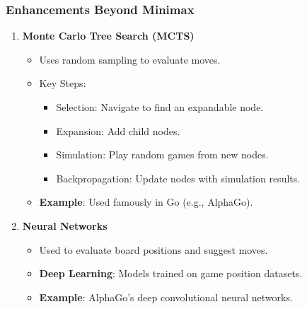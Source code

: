 \documentclass[aspectratio=169]{beamer}
\begin{document}
\begin{frame}[fragile]
    \frametitle{Enhancements Beyond Minimax}
    \begin{enumerate}
        \item \textbf{Monte Carlo Tree Search (MCTS)}
        \begin{itemize}
            \item Uses random sampling to evaluate moves.
            \item Key Steps:
            \begin{itemize}
                \item Selection: Navigate to find an expandable node.
                \item Expansion: Add child nodes.
                \item Simulation: Play random games from new nodes.
                \item Backpropagation: Update nodes with simulation results.
            \end{itemize}
            \item \textbf{Example}: Used famously in Go (e.g., AlphaGo).
        \end{itemize}
        
        \item \textbf{Neural Networks}
        \begin{itemize}
            \item Used to evaluate board positions and suggest moves.
            \item \textbf{Deep Learning}: Models trained on game position datasets.
            \item \textbf{Example}: AlphaGo's deep convolutional neural networks.
        \end{itemize}
    \end{enumerate}
\end{frame}
\end{document}
